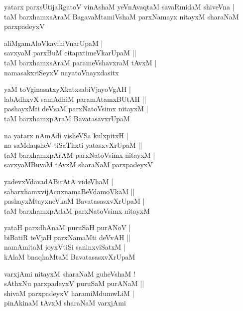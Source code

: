 \documentclass[twoside,12pt,openright]{book}
\newcounter{shloka}[chapter]
\begin{document}
\begin{shloka}
yatarx parxsUtijaRgatoV vinAshaM yeVnAvaqtaM savaRmidaM shiveVna |\\
taM barxhamxsAraM BagavaMtamiVshaM parxNamayx nitayxM sharaNaM parxpadeyxV 
\end{shloka}

\begin{shloka}
aliMgamAloVkavihiVnarUpaM |\\
savxyaM parxBuM citapxtimeVkarUpaM ||\\
taM barxhamxsAraM parameVshavxraM tAvxM |\\
namasakxriSeyxV nayatoVnayxdasitx 
\end{shloka}

\begin{shloka}
yaM toVginasatxyXkatxsabiVjayoVgAH |\\
labAdhxvX samAdhiM paramAtamxBUtAH ||\\
pashayxMti deVvaM parxNatoVsimx nitayxM |\\
taM barxhamxpAraM BavatasavxrUpaM 
\end{shloka}

\begin{shloka}
na yatarx nAmAdi visheVSa kulxpitxH |\\
na saMdaqsheV tiSaThxti yatasxvXrUpaM ||\\
taM barxhamxpArAM parxNatoVsimx nitayxM |\\
savxyaMBuvaM tAvxM sharaNaM parxpadeyxV 
\end{shloka}

\begin{shloka}
yadevxVdavadABirAtA videVhaM |\\
sabarxhamxvijAcnxnamaBeVdamoVkaM ||\\
pashayxMtayxneVkaM BavatasasxvXrUpaM |\\
taM barxhamxpAdaM parxNatoVsimx nitayxM 
\end{shloka}

\begin{shloka}
yataH parxdhAnaM puruSaH purANoV |\\
biBatiR teVjaH parxNamaMti deVvAH ||\\
namAmitaM joyxVtiSi saninxviSatxM |\\
kAlaM bnaqhaMtaM BavatasasxvXrUpaM 
\end{shloka}

\begin{shloka}
varxjAmi nitayxM sharaNaM guheVshaM !\\
sAthxNu parxpadeyxV puruSaM purANaM ||\\
shivaM parxpadeyxV haramiMdumwLiM |\\
pinAkinaM tAvxM sharaNaM varxjAmi
\end{shloka}
\end{document}
